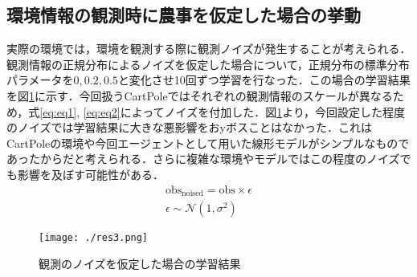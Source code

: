 \documentclass{jsarticle}
\begin{document}
\subsection{環境情報の観測時に農事を仮定した場合の挙動}
実際の環境では，環境を観測する際に観測ノイズが発生することが考えられる．観測情報の正規分布によるノイズを仮定した場合について，正規分布の標準分布パラメータを$0, 0.2, 0.5$と変化させ10回ずつ学習を行なった．この場合の学習結果を図\ref{fig:fig3}に示す．今回扱うCartPoleではそれぞれの観測情報のスケールが異なるため，式\ref{eq:eq1}, \ref{eq:eq2}によってノイズを付加した．図\ref{fig:fig3}より，今回設定した程度のノイズでは学習結果に大きな悪影響をおyボスことはなかった．これはCartPoleの環境や今回エージェントとして用いた線形モデルがシンプルなものであったからだと考えられる．さらに複雑な環境やモデルではこの程度のノイズでも影響を及ぼす可能性がある．
\begin{align}
  \text{obs}_{\text{noised}} = \text{obs} \times \epsilon
  \label{eq:eq1}\\
  \epsilon \sim \mathcal{N}(1, \sigma^{2})
  \label{eq:eq2}
\end{align}


\begin{figure}[htbp]
  \begin{center}
    \texttt{[image: ./res3.png]}
    \caption{観測のノイズを仮定した場合の学習結果}
    \label{fig:fig3}
  \end{center}
\end{figure}
\end{document}
